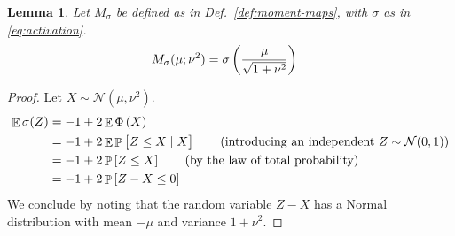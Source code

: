 \documentclass[oneside, article]{memoir}
\newtheorem{lemma}{Lemma}
\DeclareMathOperator{\expect}{\mathbb{E}}
\DeclareMathOperator{\probability}{\mathbb{P}}
\begin{document}
\begin{lemma}
  Let \(M_\sigma\) be defined as in Def.~\ref{def:moment-maps}, with
  \(\sigma\) as in \eqref{eq:activation}.
  \begin{align*}
    M_\sigma(\mu; \nu^2) &= \sigma\del{\frac{\mu}{\sqrt{1 + \nu^2}}}
  \end{align*}
  \label{lem:mean}
\end{lemma}
\begin{proof}
  Let \(X \sim \mathcal N(\mu, \nu^2)\).
  \begin{align}
    \expect \sigma(Z)
    &= -1+2\expect \Phi\del{X}
    \\
    &= -1+2\expect \probability \sbr{{Z \leq X} \mid X}
    \tag{introducing an independent \(Z \sim \mathcal{N}(0, 1)\)}
    \\
    &= -1+2\probability\sbr{{Z \leq X}}
    \tag{by the law of total probability}
    \\
    &= -1+2\probability \sbr{Z - X \leq 0}
  \end{align}
  We conclude by noting that the random variable \(Z - X\) has a
  Normal distribution with mean \(-\mu\) and variance \(1 + \nu^2\).
\end{proof}
\end{document}
